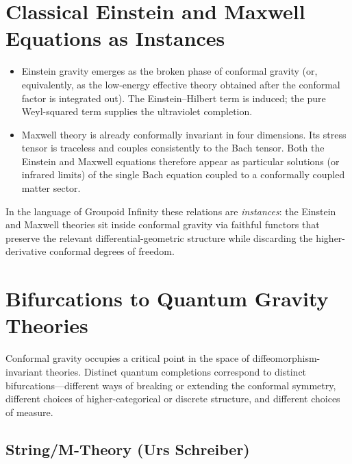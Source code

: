 \documentclass{article}
\begin{document}
\section{Classical Einstein and Maxwell Equations as Instances}
\label{sec:instances}

\begin{itemize}
\item Einstein gravity emerges as the broken phase of conformal gravity (or, equivalently, as the low-energy effective theory obtained after the conformal factor is integrated out). The Einstein--Hilbert term is induced; the pure Weyl-squared term supplies the ultraviolet completion.
\item Maxwell theory is already conformally invariant in four dimensions. Its stress tensor is traceless and couples consistently to the Bach tensor. Both the Einstein and Maxwell equations therefore appear as particular solutions (or infrared limits) of the single Bach equation coupled to a conformally coupled matter sector.
\end{itemize}

In the language of Groupoid Infinity these relations are \emph{instances}: the Einstein and Maxwell theories sit inside conformal gravity via faithful functors that preserve the relevant differential-geometric structure while discarding the higher-derivative conformal degrees of freedom.

\section{Bifurcations to Quantum Gravity Theories}
\label{sec:bifurcations}

Conformal gravity occupies a critical point in the space of diffeomorphism-invariant theories. Distinct quantum completions correspond to distinct bifurcations---different ways of breaking or extending the conformal symmetry, different choices of higher-categorical or discrete structure, and different choices of measure.

\subsection{String/M-Theory (Urs Schreiber)}
\end{document}
